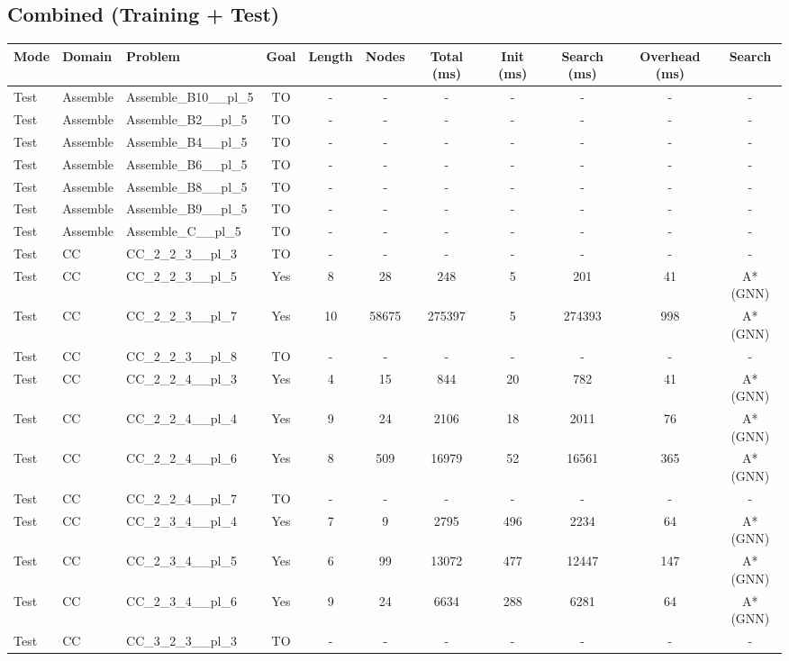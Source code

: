 \documentclass{article}
\begin{document}
\subsection*{Combined (Training + Test)}
\begin{tabular}{lllcccccccc}
\toprule
Mode & Domain & Problem & Goal & Length & Nodes & Total (ms) & Init (ms) & Search (ms) & Overhead (ms) & Search \\
\midrule
Test & Assemble & Assemble\_B10\_\_pl\_5 & TO & - & - & - & - & - & - & - \\
Test & Assemble & Assemble\_B2\_\_pl\_5 & TO & - & - & - & - & - & - & - \\
Test & Assemble & Assemble\_B4\_\_pl\_5 & TO & - & - & - & - & - & - & - \\
Test & Assemble & Assemble\_B6\_\_pl\_5 & TO & - & - & - & - & - & - & - \\
Test & Assemble & Assemble\_B8\_\_pl\_5 & TO & - & - & - & - & - & - & - \\
Test & Assemble & Assemble\_B9\_\_pl\_5 & TO & - & - & - & - & - & - & - \\
Test & Assemble & Assemble\_C\_\_pl\_5 & TO & - & - & - & - & - & - & - \\
Test & CC & CC\_2\_2\_3\_\_pl\_3 & TO & - & - & - & - & - & - & - \\
Test & CC & CC\_2\_2\_3\_\_pl\_5 & Yes & 8 & 28 & 248 & 5 & 201 & 41 & A*(GNN) \\
Test & CC & CC\_2\_2\_3\_\_pl\_7 & Yes & 10 & 58675 & 275397 & 5 & 274393 & 998 & A*(GNN) \\
Test & CC & CC\_2\_2\_3\_\_pl\_8 & TO & - & - & - & - & - & - & - \\
Test & CC & CC\_2\_2\_4\_\_pl\_3 & Yes & 4 & 15 & 844 & 20 & 782 & 41 & A*(GNN) \\
Test & CC & CC\_2\_2\_4\_\_pl\_4 & Yes & 9 & 24 & 2106 & 18 & 2011 & 76 & A*(GNN) \\
Test & CC & CC\_2\_2\_4\_\_pl\_6 & Yes & 8 & 509 & 16979 & 52 & 16561 & 365 & A*(GNN) \\
Test & CC & CC\_2\_2\_4\_\_pl\_7 & TO & - & - & - & - & - & - & - \\
Test & CC & CC\_2\_3\_4\_\_pl\_4 & Yes & 7 & 9 & 2795 & 496 & 2234 & 64 & A*(GNN) \\
Test & CC & CC\_2\_3\_4\_\_pl\_5 & Yes & 6 & 99 & 13072 & 477 & 12447 & 147 & A*(GNN) \\
Test & CC & CC\_2\_3\_4\_\_pl\_6 & Yes & 9 & 24 & 6634 & 288 & 6281 & 64 & A*(GNN) \\
Test & CC & CC\_3\_2\_3\_\_pl\_3 & TO & - & - & - & - & - & - & - \\

\end{tabular}
\end{document}
